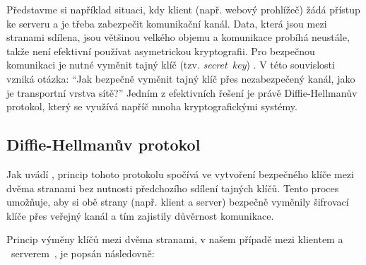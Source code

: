 Představme si například situaci, kdy klient (např. webový prohlížeč) žádá přístup ke serveru a je třeba zabezpečit komunikační kanál. Data, která jsou mezi stranami sdílena, jsou většinou velkého objemu a komunikace probíhá neustále, takže není efektivní používat asymetrickou kryptografii. Pro bezpečnou komunikaci je nutné vyměnit tajný klíč (tzv. \emph{secret~key}) \textcite{wikijs2024}. V této souvislosti vzniká otázka: \enquote{Jak bezpečně vyměnit tajný klíč přes nezabezpečený kanál, jako je transportní vrstva sítě?} Jedním z efektivních řešení je právě \mbox{Diffie-Hellmanův} protokol, který se využívá napříč mnoha kryptografickými systémy.

\subsection{Diffie-Hellmanův protokol}
\label{sec:diffie-hellman}

Jak uvádí \textcite{diffie1976}, princip tohoto protokolu spočívá ve vytvoření bezpečného klíče mezi dvěma stranami bez nutnosti předchozího sdílení tajných klíčů. Tento proces umožňuje, aby si obě strany (např. klient a server) bezpečně vyměnily šifrovací klíče přes veřejný kanál a tím zajistily důvěrnost komunikace.

Princip výměny klíčů mezi dvěma stranami, v našem případě mezi klientem a ~serverem~, je popsán následovně:

